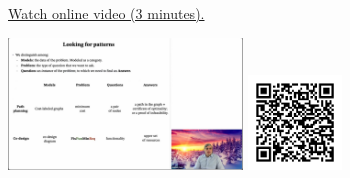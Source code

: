 
\begin{minipage}{10cm}
    \href{https://act4e-spring21.netlify.app/videos/spring2021-functorial-comp-a:patterns.html}{Watch online video (3 minutes).}
        
    \href{https://act4e-spring21.netlify.app/videos/spring2021-functorial-comp-a:patterns.html}{\includegraphics[height=3.5cm]{spring2021-functorial-comp-a:patterns/thumbnails.jpg}}
    \href{https://act4e-spring21.netlify.app/videos/spring2021-functorial-comp-a:patterns.html}{\includegraphics[height=2.5cm]{spring2021-functorial-comp-a:patterns/qrcode.png}}
\end{minipage}
